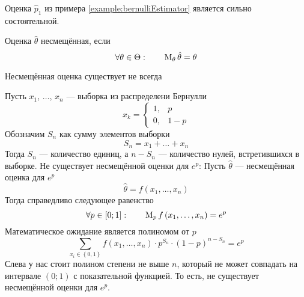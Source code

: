 \begin{example}
  Оценка $\hat{p}_1$ из примера \ref{example:bernulliEstimator}
  является сильно состоятельной.
\end{example}

\begin{definition}
  \label{def:estimatorBias}
  Оценка $\hat{\theta}$ несмещённая, если
  \begin{equation*}
    \forall\theta\in\Theta: \qquad \operatorname{M}_{\theta} \hat{\theta} = \theta
  \end{equation*}
\end{definition}

\begin{remark}
  Несмещённая оценка существует не всегда
\end{remark}

\begin{example}
  Пусть $x_1$, $\dots$, $x_n$ --- выборка из распределени Бернулли
  \begin{equation*}
    x_k =
    \begin{cases}
      1,& p \\
      0,& 1-p
    \end{cases}
  \end{equation*}
  Обозначим $S_n$ как сумму элементов выборки
  \begin{equation*}
    S_n = x_1 + \dots + x_n
  \end{equation*}
  Тогда $S_n$ --- количество единиц, а $n-S_n$ --- количество нулей,
  встретившихся в выборке.
  Не существует несмещённой оценки для $e^p$:
  Пусть $\hat{\theta}$ --- несмещённая оценка для $e^p$
  \begin{equation*}
    \hat{\theta} = f\left( x_1, \dots, x_n \right)
  \end{equation*}
  Тогда справедливо следующее равенство
  \begin{equation*}
    \forall p \in \left[ 0; 1 \right]:\qquad
    \operatorname{M}_{p} f\left( x_1, \dots, x_n \right)
    = e^p
  \end{equation*}
  Математическое ожидание является полиномом от $p$
  \begin{equation*}
    \sum_{x_i \in \left\{ 0, 1 \right\}} f\left( x_1, \dots, x_n \right)
      \cdot p^{S_n} \cdot \left( 1 - p \right)^{n - S_n}
    = e^p
  \end{equation*}
  Слева у нас стоит полином степени не выше $n$, который не может совпадать на
  интервале $\left( 0; 1 \right)$ с показательной функцией.
  То есть, не существует несмещённой оценки для $e^p$.
\end{example}

